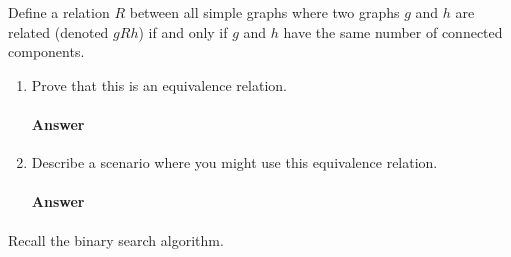 \documentclass{article}
\begin{document}
\collab{\todo{}} 

Define a relation $R$ between all simple graphs where two graphs $g$ and $h$ are
related (denoted $gRh$) if and only if $g$ and $h$ have the same number of
connected components.

\begin{enumerate}

    \item Prove that this is an equivalence relation.

        \paragraph{Answer}


    \item Describe a scenario where you might use this equivalence relation.

        \paragraph{Answer}


\end{enumerate}

\collab{\todo{}} 

Recall the binary search algorithm.
\end{document}
